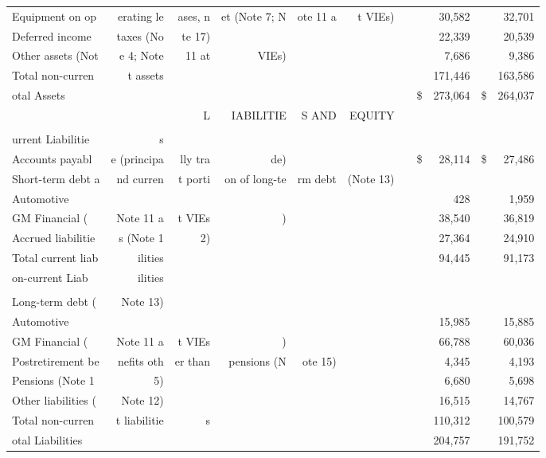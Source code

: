 \documentclass{article}
\begin{document}
\begin{table}[ht]
\begin{tabular}{lrrrrrrrrrr}
Equipment on op & erating le & ases, n & et (Note 7; N & ote 11 a & t VIEs) &  &  & 30,582 &  & 32,701 \\
Deferred income & taxes (No & te 17) &  &  &  &  &  & 22,339 &  & 20,539 \\
Other assets (Not & e 4; Note & 11 at & VIEs) &  &  &  &  & 7,686 &  & 9,386 \\
Total non-curren & t assets &  &  &  &  &  &  & 171,446 &  & 163,586 \\
otal Assets &  &  &  &  &  &  & \$ & 273,064 & \$ & 264,037 \\
 &  & L & IABILITIE & S AND & EQUITY &  &  &  &  &  \\
 &  &  &  &  &  &  &  &  &  &  \\
urrent Liabilitie & s &  &  &  &  &  &  &  &  &  \\
Accounts payabl & e (principa & lly tra & de) &  &  &  & \$ & 28,114 & \$ & 27,486 \\
Short-term debt a & nd curren & t porti & on of long-te & rm debt & (Note 13) &  &  &  &  &  \\
Automotive &  &  &  &  &  &  &  & 428 &  & 1,959 \\
GM Financial ( & Note 11 a & t VIEs & ) &  &  &  &  & 38,540 &  & 36,819 \\
Accrued liabilitie & s (Note 1 & 2) &  &  &  &  &  & 27,364 &  & 24,910 \\
Total current liab & ilities &  &  &  &  &  &  & 94,445 &  & 91,173 \\
on-current Liab & ilities &  &  &  &  &  &  &  &  &  \\
 &  &  &  &  &  &  &  &  &  &  \\
Long-term debt ( & Note 13) &  &  &  &  &  &  &  &  &  \\
Automotive &  &  &  &  &  &  &  & 15,985 &  & 15,885 \\
GM Financial ( & Note 11 a & t VIEs & ) &  &  &  &  & 66,788 &  & 60,036 \\
Postretirement be & nefits oth & er than & pensions (N & ote 15) &  &  &  & 4,345 &  & 4,193 \\
Pensions (Note 1 & 5) &  &  &  &  &  &  & 6,680 &  & 5,698 \\
Other liabilities ( & Note 12) &  &  &  &  &  &  & 16,515 &  & 14,767 \\
Total non-curren & t liabilitie & s &  &  &  &  &  & 110,312 &  & 100,579 \\
otal Liabilities &  &  &  &  &  &  &  & 204,757 &  & 191,752 \\

\end{tabular}
\end{table}
\end{document}
